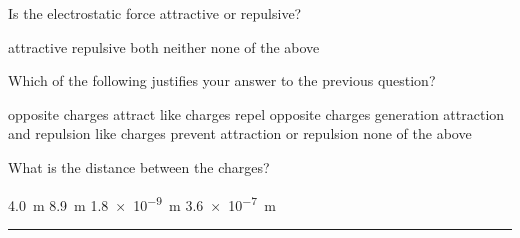 \documentclass{exam}
\begin{document}
\begin{questions}
\begin{center}
\end{center}

\question \label{yETfik}
Is the electrostatic force attractive or repulsive?

\begin{randomizechoices}[keeplast]
    \correctchoice attractive
    \choice repulsive
    \choice both
    \choice neither
    \choice none of the above
\end{randomizechoices}

\question
Which of the following justifies your answer to the previous question?

\begin{randomizechoices}[keeplast]
    \correctchoice opposite charges attract
    \choice like charges repel
    \choice opposite charges generation attraction and repulsion
    \choice like charges prevent attraction or repulsion
    \choice none of the above
\end{randomizechoices}

\question \label{b4zyju}
What is the distance between the charges?

\begin{randomizechoices}
    \correctchoice \qty{4.0}{m}
    \choice \qty{8.9}{m}
    \choice \qty{1.8e-9}{m}
    \choice \qty{3.6e-7}{m}
\end{randomizechoices}
\vspace{1em}

\hrule


\end{questions}
\end{document}
